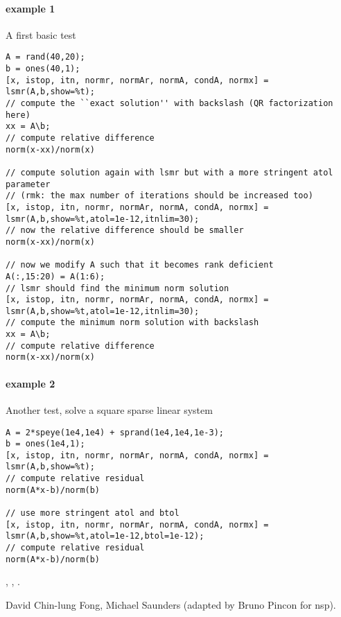 \begin{examples}
\paragraph{example 1} A first basic test
\begin{Verbatim}
A = rand(40,20);
b = ones(40,1);
[x, istop, itn, normr, normAr, normA, condA, normx] = lsmr(A,b,show=%t);
// compute the ``exact solution'' with backslash (QR factorization here)
xx = A\b;
// compute relative difference 
norm(x-xx)/norm(x)

// compute solution again with lsmr but with a more stringent atol parameter
// (rmk: the max number of iterations should be increased too)
[x, istop, itn, normr, normAr, normA, condA, normx] = lsmr(A,b,show=%t,atol=1e-12,itnlim=30);
// now the relative difference should be smaller
norm(x-xx)/norm(x)

// now we modify A such that it becomes rank deficient
A(:,15:20) = A(1:6);
// lsmr should find the minimum norm solution
[x, istop, itn, normr, normAr, normA, condA, normx] = lsmr(A,b,show=%t,atol=1e-12,itnlim=30);
// compute the minimum norm solution with backslash
xx = A\b;
// compute relative difference
norm(x-xx)/norm(x)
\end{Verbatim}

\paragraph{example 2} Another test, solve a square sparse linear system
\begin{Verbatim}
A = 2*speye(1e4,1e4) + sprand(1e4,1e4,1e-3);
b = ones(1e4,1);
[x, istop, itn, normr, normAr, normA, condA, normx] = lsmr(A,b,show=%t);
// compute relative residual
norm(A*x-b)/norm(b)

// use more stringent atol and btol
[x, istop, itn, normr, normAr, normA, condA, normx] = lsmr(A,b,show=%t,atol=1e-12,btol=1e-12);
// compute relative residual
norm(A*x-b)/norm(b)
\end{Verbatim}

\end{examples}

\begin{manseealso}
  , , .
\end{manseealso}

\begin{authors}
  David Chin-lung Fong, Michael Saunders (adapted by Bruno Pincon for nsp).
\end{authors}
